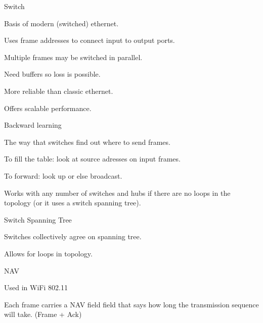 \documentclass[main.tex]{subfiles}
\begin{document}
\begin{card}{Switch}
\item Basis of modern (switched) ethernet.
\item Uses frame addresses to connect input to output ports.
\item Multiple frames may be switched in parallel.
\item Need buffers so loss is possible.
\item More reliable than classic ethernet.
\item Offers scalable performance.
\end{card}

\begin{card}{Backward learning}
\item The way that switches find out where to send frames.
\item To fill the table: look at source adresses on input frames.
\item To forward: look up or else broadcast.
\item Works with any number of switches and hubs if there are no loops in the topology (or it uses a switch spanning tree).
\end{card}

\begin{card}{Switch Spanning Tree}
\item Switches collectively agree on spanning tree.
\item Allows for loops in topology.
\end{card}

\begin{card}{NAV}
\item Used in WiFi 802.11
\item Each frame carries a NAV field field that says how long the transmission sequence will take. (Frame + Ack)
\end{card}
\end{document}
